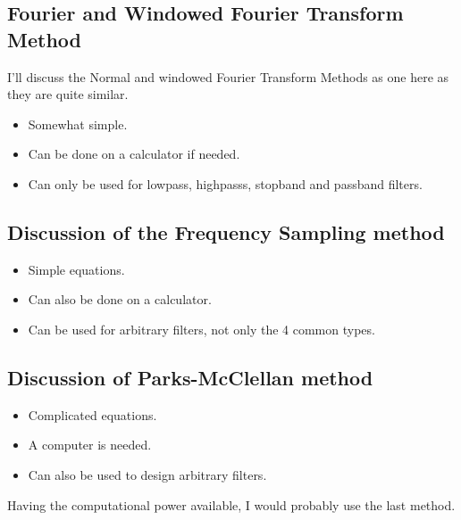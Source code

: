 \documentclass[a4wide,10pt]{article}
\begin{document}
		\subsection{Fourier and Windowed Fourier Transform Method} %
		\label{sub:fourier_and_windowed_fourier_transform_method}
			I'll discuss the Normal and windowed Fourier Transform Methods as one here as they are quite similar.
			\begin{itemize}
				\item Somewhat simple.
				\item Can be done on a calculator if needed.
				\item Can only be used for lowpass, highpasss, stopband and passband filters.
			\end{itemize}
		
		\subsection{Discussion of the Frequency Sampling method} %
		\label{sub:discussion_of_the_frequency_sampling_method}
			\begin{itemize}
				\item Simple equations.
				\item Can also be done on a calculator.
				\item Can be used for arbitrary filters, not only the 4 common types.
			\end{itemize}
		
		\subsection{Discussion of Parks-McClellan method} %
		\label{sub:discussion_of_parks_mcclellan_method}
			\begin{itemize}
				\item Complicated equations.
				\item A computer is needed.
				\item Can also be used to design arbitrary filters.
			\end{itemize}
	Having the computational power available, I would probably use the last method.
\end{document}
